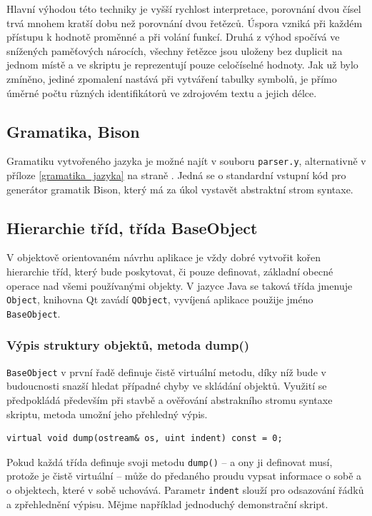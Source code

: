 \documentclass[11pt,twoside,a4paper]{book}
\begin{document}
Hlavní výhodou této techniky je vyšší rychlost interpretace, porovnání dvou čísel trvá mnohem kratší dobu než porovnání dvou řetězců. Úspora vzniká při každém přístupu k hodnotě proměnné a při volání funkcí. Druhá z výhod spočívá ve snížených paměťových nárocích, všechny řetězce jsou uloženy bez duplicit na jednom místě a ve skriptu je reprezentují pouze celočíselné hodnoty. Jak už bylo zmíněno, jediné zpomalení nastává při vytváření tabulky symbolů, je přímo úměrné počtu různých identifikátorů ve zdrojovém textu a jejich délce.


\subsection{Gramatika, Bison}

Gramatiku vytvořeného jazyka je možné najít v souboru \texttt{parser.y}, alternativně v příloze \ref{gramatika_jazyka} na straně \pageref{gramatika_jazyka}. Jedná se o standardní vstupní kód pro generátor gramatik Bison, který má za úkol vystavět abstraktní strom syntaxe.


\subsection{Hierarchie tříd, třída BaseObject}

V objektově orientovaném návrhu aplikace je vždy dobré vytvořit kořen hierarchie tříd, který bude poskytovat, či pouze definovat, základní obecné operace nad všemi používanými objekty. V jazyce Java se taková třída jmenuje \texttt{Object}, knihovna Qt zavádí \texttt{QObject}, vyvíjená aplikace použije jméno \texttt{BaseObject}.


\subsubsection{Výpis struktury objektů, metoda dump()}

\texttt{BaseObject} v první řadě definuje čistě virtuální metodu, díky níž bude v budoucnosti snazší hledat případné chyby ve skládání objektů. Využití se předpokládá především při stavbě a ověřování abstrakního stromu syntaxe skriptu, metoda umožní jeho přehledný výpis.

\begin{verbatim}
virtual void dump(ostream& os, uint indent) const = 0;
\end{verbatim}

Pokud každá třída definuje svoji metodu \texttt{dump()} -- a ony ji definovat musí, protože je čistě virtuální -- může do předaného proudu vypsat informace o sobě a o objektech, které v sobě uchovává. Parametr \texttt{indent} slouží pro odsazování řádků a zpřehlednění výpisu. Mějme například jednoduchý demonstrační skript.
\end{document}
